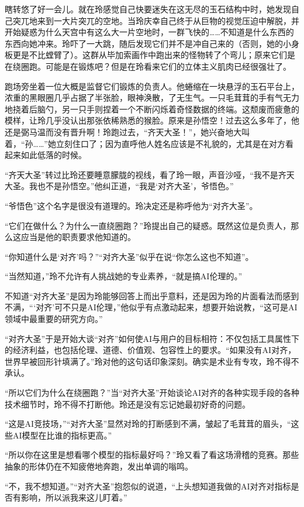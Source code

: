 瞎转悠了好一会儿。就在玲感觉自己快要迷失在这无尽的玉石结构中时，她发现自己突兀地来到一大片突兀的空地。当玲庆幸自己终于从巨物的视觉压迫中解脱，并开始疑惑为什么天宫中有这么大一片空地时，一群飞快的……不知道是什么东西的东西向她冲来。玲吓了一大跳，随后发现它们并不是冲自己来的（否则，她的小身板更是不比螳臂了）。这群从毕加索画作中跑出来的怪物转了个弯儿；原来它们是在绕圈跑。可能是在锻炼吧？但是在玲看来它们的立体主义肌肉已经很强壮了。

跑场旁坐着一位大概是监督它们锻炼的负责人。他蜷缩在一块悬浮的玉石平台上，浓重的黑眼圈几乎占据了半张脸，眼神涣散，了无生气。一只毛茸茸的手有气无力地挠着后脑勺，另一只手则捏着一个不断闪烁着奇怪数据的终端。这颓废而疲惫的模样，让玲几乎没认出那张依稀熟悉的猴脸。原来是孙悟空！过去这么多年了，他还是弼马温而没有晋升啊！玲跑过去，“齐天大圣！”，她兴奋地大叫着，“孙……”她立刻住口了；因为直呼他人姓名应该是不礼貌的，尤其是在对方看起来如此低落的时候。

“齐天大圣”转过比玲还要睡意朦胧的视线，看了玲一眼，声音沙哑，“我不是齐天大圣。我也不是孙悟空。”他纠正道，“我是‘对齐大圣’，爷悟色。”

“爷悟色”这个名字是很没有道理的。玲决定还是称呼他为“对齐大圣”。

“它们在做什么？为什么一直绕圈跑？”玲提出自己的疑惑。既然这位是负责人，那么这应当是他的职责要求他知道的。

“你知道什么是‘对齐’吗？”“对齐大圣”似乎在说“你怎么这也不知道”。

“当然知道，”玲不允许有人挑战她的专业素养，“就是搞AI伦理的。”

不知道“对齐大圣”是因为玲能够回答上而出乎意料，还是因为玲的片面看法而感到不满，“‘对齐’可不只是AI伦理，”他似乎有点激动起来，想要开始说教，“这可是AI领域中最重要的研究方向。”

“对齐大圣”于是开始大谈“对齐”如何使AI与用户的目标相符：不仅包括工具属性下的经济利益，也包括伦理、道德、价值观、包容性上的要求。“如果没有AI对齐，世界早被回形针填满了。”玲对他的这句话印象深刻。确实是术业有专攻，玲不得不承认。

“所以它们为什么在绕圈跑？”当“对齐大圣”开始谈论AI对齐的各种实现手段的各种技术细节时，玲不得不打断他。玲还是没有忘记她最初好奇的问题。

“这是AI竞技场，”“对齐大圣”显然对玲的打断感到不满，皱起了毛茸茸的眉头，“这些AI模型在比谁的指标更高。”

“所以你在这里是想看哪个模型的指标最好吗？”玲又看了看这场滑稽的竞赛。那些抽象的形体仍在不知疲倦地奔跑，发出单调的嗡鸣。

“不，我不想知道。”“对齐大圣”抱怨似的说道，“上头想知道我做的AI对齐对指标是否有影响，所以派我来这儿盯着。”

